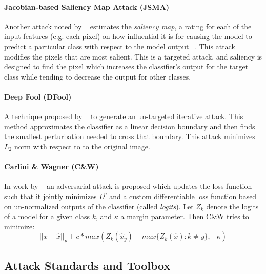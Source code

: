 \paragraph{Jacobian-based Saliency Map Attack (JSMA)} Another attack noted by  ~\citet{papernot_limitations_2015}
  estimates the \emph{saliency map}, a rating for each of the input features (e.g. each pixel) on how influential it is for causing the model to predict a particular class with respect to the model output ~\citep{wiyatno2018saliency}. This attack modifies the pixels that are most salient. This is a targeted attack, and saliency is designed to find the pixel which increases the classifier's output for the target class while tending to decrease the output for other classes.

\paragraph{Deep Fool (DFool)} A technique proposed by ~\citet{moosavi-dezfooli_deepfool:_2015}
  to generate an un-targeted iterative attack. 
This method approximates the classifier as a linear decision boundary and then finds the smallest perturbation needed to cross that boundary.
This attack minimizes $L_2$ norm with respect to  to the original image.

\paragraph{Carlini \& Wagner (C\&W)} In work by ~\citet{carlini_towards_2016}
  an adversarial attack is proposed which updates the loss function
  such that it jointly minimizes $L^p$ and a custom differentiable
  loss function based on un-normalized outputs of the classifier
  (called \textit{logits}). 
Let $Z_k$ denote the logits of a model for a given class $k$, and $\kappa$ a margin parameter. Then C\&W tries to minimize:
\begin{equation}
|| x - \hat{x} ||_p + c* max\left(Z_k(\hat{x}_y) - max\{Z_k(\hat{x}) : k \neq y\},-\kappa\right)
\end{equation}

\subsection{Attack Standards and Toolbox}

